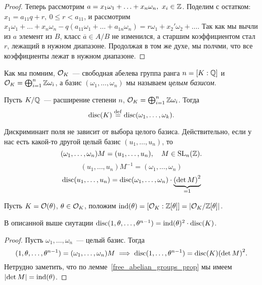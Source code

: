 \begin{definition}
\begin{proof}
			Теперь рассмотрим $a = x_1 \omega_1 + \ldots + x_n \omega_n, \ x_i \in \Z$. Поделим с остатком: $x_1 = a_{11}q + r, \ 0 \le r  < a_{11}$, и рассмотрим $x_{1} \omega_{1} + \ldots + x_n \omega_n - q(a_{11}\omega_1 + \ldots + a_{1n}\omega_n) = r\omega_1 + x_{2}'\omega_{2} + \ldots$.  Так как мы вычли из $a$ элемент из $B$, класс $\overline{a} \in A/B$ не изменился, а старшим коэффициентом стал $r$, лежащий в нужном диапазоне. Продолжая в том же духе, мы полчми, что все коэффициенты лежат в нужном диапазоне. 
		\end{proof}

		Как мы помним, $\cO_{K}$~--- свободная абелева группа ранга $n = [K : \Q]$ и $\cO_{K} = \bigoplus_{i = 1}^{n} \Z \omega_{i}$, а  базис $(\omega_{1}, \ldots, \omega_{n})$ мы называем \emph{целым базисом}.

		\begin{definition} 
			Пусть $K/\Q$~--- расширение степени $n$,  $\cO_{K} = \bigoplus_{i = 1}^{n} \Z \omega_{i}$. Тогда 
			\[
				\disc(K) \eqdef \disc\lr*{\omega_{1}, \ldots, \omega_{k}}.
			\]
		\end{definition}
	
		\begin{remark}
			Дискриминант поля не зависит от выбора целого базиса. Действительно, если у нас есть какой-то другой целый базис $(u_1, \ldots, u_n)$, то 
			\[
				(\omega_{1}, \ldots, \omega_{n})M = (u_1, \ldots, u_n), \quad M \in \mathrm{SL}_{n}(\Z).
			\]
			\[
				 (u_1, \ldots, u_n)M^{-1} = (\omega_{1}, \ldots, \omega_{n}) 
			\]
			\[
				\disc(u_1, \ldots, u_n) = \disc(\omega_1, \ldots, \omega_n) \cdot \underbrace{\lr*{\det{M}}^{2}}_{= 1}
			\]
		\end{remark}

		Пусть $K = \cO(\theta)$, $\theta \in \cO_{K}$, положим $\ind(\theta) = [\cO_{K} : \Z[\theta]] = \left\lvert \cO_{K}/\Z[\theta] \right\rvert$. 

		\begin{statement}\label{dic_and_ind} 
			В описанной выше сиутации $\disc(1, \theta, \ldots, \theta^{n - 1}) = \ind(\theta)^{2} \cdot \disc(K)$.
		\end{statement}
		\begin{proof}
			Пусть $\omega_{1}, \ldots, \omega_{n}$~--- целый базис. Тогда 
			\[
				(1, \theta, \ldots, \theta^{n - 1}) = (\omega_{1}, \ldots, \omega_{n})M \implies \disc(1, \ldots, \theta^{n - 1}) = \disc(K) \lr*{\det{M}}^{2}.
			\]
			Нетрудно заметить, что по лемме~\ref{free_abelian_groups_prop} мы имеем $\left\lvert \det{M} \right\rvert = \ind(\theta)$.
			

\end{proof}
\end{definition}

